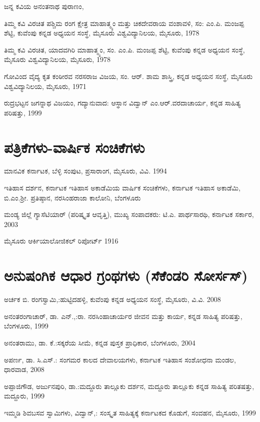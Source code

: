\noindent
ಜನ್ನ ಕವಿಯ ಅನಂತನಾಥ ಪುರಾಣಂ,

\noindent
ತಿಮ್ಮ ಕವಿ ವಿರಚಿತ ಪಶ್ಚಿಮ ರಂಗ ಕ್ಷೇತ್ರ ಮಾಹಾತ್ಮ್ಯಂ ಮತ್ತು ಚಿಕದೇವರಾಯ ವಂಶಾವಳಿ, ಸಂ: ಎಂ.ಪಿ. ಮಂಜಪ್ಪ ಶೆಟ್ಟಿ, ಕುವೆಂಪು ಕನ್ನಡ ಅಧ್ಯಯನ ಸಂಸ್ಥೆ, ಮೈಸೂರು ವಿಶ್ವವಿದ್ಯಾನಿಲಯ, ಮೈಸೂರು, 1978

\noindent
ತಿಮ್ಮ ಕವಿ ವಿರಚಿತ, ಯಾದವಗಿರಿ ಮಾಹಾತ್ಮ್ಯಂ, ಸಂ. ಎಂ.ಪಿ. ಮಂಜಪ್ಪ ಶೆಟ್ಟಿ, ಕುವೆಂಪು ಕನ್ನಡ ಅಧ್ಯಯನ ಸಂಸ್ಥೆ, ಮೈಸೂರು ವಿಶ್ವವಿದ್ಯಾನಿಲಯ, ಮೈಸೂರು, 1978

\noindent
ಗೋವಿಂದ ವೈದ್ಯ ಕೃತ ಕಂಠೀರವ ನರಸರಾಜ ವಿಜಯ, ಸಂ. ಆರ್​. ಶಾಮ ಶಾಸ್ತ್ರಿ, ಕನ್ನಡ ಅಧ್ಯಯನ ಸಂಸ್ಥೆ, ಮೈಸೂರು ವಿಶ್ವವಿದ್ಯಾನಿಲಯ, ಮೈಸೂರು, 1971

\noindent
ರುದ್ರಭಟ್ಟನ ಜಗನ್ನಾಥ ವಿಜಯಂ, ಗದ್ಯಾನುವಾದ: ಆಸ್ಥಾನ ವಿದ್ವಾನ್​ ಎಂ.ಆರ್​.ವರದಾಚಾರ್ಯ, ಕನ್ನಡ ಸಾಹಿತ್ಯ ಪರಿಷತ್ತು, 1999


\section{ಪತ್ರಿಕೆಗಳು-ವಾರ್ಷಿಕ ಸಂಚಿಕೆಗಳು}

\noindent
ಮಾನವಿಕ ಕರ್ನಾಟಕ, ಬೆಳ್ಳಿ ಸಂಪುಟ, ಪ್ರಸಾರಾಂಗ, ಮೈಸೂರು, ವಿವಿ. 1994

\noindent
ಇತಿಹಾಸ ದರ್ಶನ, ಕರ್ನಾಟಕ ಇತಿಹಾಸ ಅಕಾಡೆಮಿಯ ವಾರ್ಷಿಕ ಸಂಚಿಕೆಗಳು, ಕರ್ನಾಟಕ ಇತಿಹಾಸ ಅಕಾಡೆಮಿ, ಬಿ.ಎಂ.ಶ‍್ರೀ. ಪ್ರತಿಷ್ಠಾನ, ನರಸಿಂಹರಾಜಾ ಕಾಲೋನಿ, ಬೆಂಗಳೂರು

\noindent
ಮಂಡ್ಯ ಜಿಲ್ಲೆ ಗ್ಯಾಸೆಟಿಯಾರ್​ (ಪರಿಷ್ಕೃತ ಆವೃತ್ತಿ), ಮುಖ್ಯ ಸಂಪಾದಕರು: ಟಿ.ಎ. ಪಾರ್ಥಸಾರಥಿ, ಕರ್ನಾಟಕ ಸರ್ಕಾರ, 2003

\noindent
ಮೈಸೂರು ಆರ್ಕಿಯಾಲೋಜಿಕಲ್​ ರಿಪೋರ್ಟ್ 1916


\section{ಅನುಷಂಗಿಕ ಆಧಾರ ಗ್ರಂಥಗಳು (ಸೆಕೆಂಡರಿ ಸೋರ್ಸಸ್​)}

\noindent
ಅರ್ಚಕ ಬಿ. ರಂಗಸ್ವಾಮಿ,:ಹುಟ್ಟಿದಹಳ್ಳಿ, ಕುವೆಂಪು ಕನ್ನಡ ಅಧ್ಯಯನ ಸಂಸ್ಥೆ, ಮೈಸೂರು, ವಿ.ವಿ. 2008

\noindent
ಅನಂತರಂಗಾಚಾರ್​, ಡಾ. ಎನ್​.,:ರಾ. ನರಸಿಂಹಾಚಾರ್ಯರ ಜೀವನ ಮತ್ತು ಕಾರ್ಯ, ಕನ್ನಡ ಸಾಹಿತ್ಯ ಪರಿಷತ್ತು, ಬೆಂಗಳೂರು, 1999

\noindent
ಅನಂತರಾಮು, ಡಾ. ಕೆ.:ಸಕ್ಕರೆಯ ಸೀಮೆ, ಕನ್ನಡ ಪುಸ್ತಕ ಪ್ರಾಧಿಕಾರ, ಬೆಂಗಳೂರು, 2004

\noindent
ಅಪರ್ಣ, ಡಾ. ಸಿ.ಎಸ್​.: ಸಂಗಮರ ಕಾಲದ ದೇವಾಲಯಗಳು, ಕರ್ನಾಟಕ ಇತಿಹಾಸ ಸಂಶೋಧನಾ ಮಂಡಲ, ಧಾರವಾಡ, 2008

\noindent
ಅಪ್ಪಾಜಿಗೌಡ, ಅರ್ಜುನಪುರಿ, ಡಾ.:ಮದ್ದೂರು ತಾಲ್ಲೂಕು ದರ್ಶನ, ಮದ್ದೂರು ತಾಲ್ಲೂಕು ಕನ್ನಡ ಸಾಹಿತ್ಯ ಪರಿತಷತ್ತು, ಮದ್ದೂರು, 1999

\noindent
ಇಮ್ಮಡಿ ಶಿವಬಸವ ಸ್ವಾಮಿಗಳು, ವಿದ್ವಾನ್​,: ಸಂಸ್ಕೃತ ಸಾಹಿತ್ಯಕ್ಕೆ ಕರ್ನಾಟಕದ ಕೊಡುಗೆ, ಸಂವಹನ, ಮೈಸೂರು, 1999

